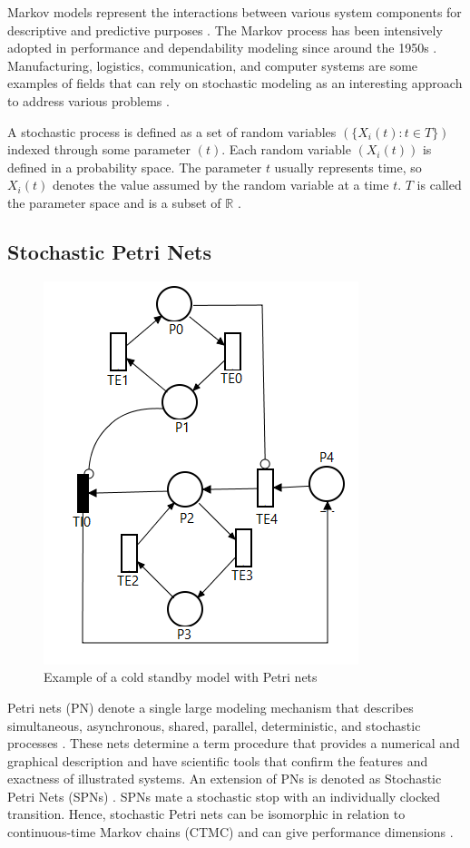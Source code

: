 \documentclass[conference]{IEEEtran}
\begin{document}
Markov models represent the interactions between various system components for descriptive and predictive purposes \citep{daniel2004performance}. The Markov process has been intensively adopted in performance and dependability modeling since around the 1950s \citep{maciel2012dependability}. Manufacturing, logistics, communication, and computer systems are some examples of fields that can rely on stochastic modeling as an interesting approach to address various problems \citep{maciel2021survey}.

A stochastic process is defined as a set of random variables $(\{ X_{i}(t):t \in T \})$ indexed through some parameter $(t)$. Each random variable $(X_i(t))$ is defined in a probability space. The parameter $t$ usually represents time, so $X_{i}(t)$ denotes the value assumed by the random variable at a time $t$. $T$  is called the parameter space and is a subset of $\mathbb{R}$ \citep{maciel2021survey}.

\subsection{Stochastic Petri Nets}

\begin{figure}[htbp]
\centerline{\includegraphics[scale=0.5]{img/cold-standby-example.png}}
\caption{Example of a cold standby model with Petri nets}
\label{fig:stochastic_petri_net_example}
\end{figure}

Petri nets (PN) denote a single large modeling mechanism that describes simultaneous, asynchronous, shared, parallel, deterministic, and stochastic processes \citep{german2000performance}. These nets determine a term procedure that provides a numerical and graphical description and have scientific tools that confirm the features and exactness of illustrated systems. An extension of PNs is denoted as Stochastic Petri Nets (SPNs) \citep{marsan1998modelling}. SPNs mate a stochastic stop with an individually clocked transition. Hence, stochastic Petri nets can be isomorphic in relation to continuous-time Markov chains (CTMC) and can give performance dimensions \citep{molloy1982integration}.
\end{document}
